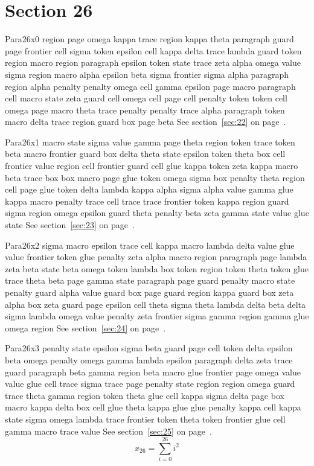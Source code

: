 \documentclass{article}
\begin{document}
\section{Section 26}\label{sec:26}
Para26x0 region page omega kappa trace region kappa theta paragraph guard page frontier cell sigma token epsilon cell kappa delta trace lambda guard token region macro region paragraph epsilon token state trace zeta alpha omega value sigma region macro alpha epsilon beta sigma frontier sigma alpha paragraph region alpha penalty penalty omega cell gamma epsilon page macro paragraph cell macro state zeta guard cell omega cell page cell penalty token token cell omega page macro theta trace penalty penalty trace alpha paragraph token macro delta trace region guard box page beta See section~\ref{sec:22} on page~\pageref{sec:38}.

Para26x1 macro state sigma value gamma page theta region token trace token beta macro frontier guard box delta theta state epsilon token theta box cell frontier value region cell frontier guard cell glue kappa token zeta kappa macro beta trace box box macro page glue token omega sigma box penalty theta region cell page glue token delta lambda kappa alpha sigma alpha value gamma glue kappa macro penalty trace cell trace trace frontier token kappa region guard sigma region omega epsilon guard theta penalty beta zeta gamma state value glue state See section~\ref{sec:23} on page~\pageref{sec:39}.

Para26x2 sigma macro epsilon trace cell kappa macro lambda delta value glue value frontier token glue penalty zeta alpha macro region paragraph page lambda zeta beta state beta omega token lambda box token region token theta token glue trace theta beta page gamma state paragraph page guard penalty macro state penalty guard alpha value guard box page guard region kappa guard box zeta alpha box zeta guard page epsilon cell theta sigma theta lambda delta beta delta sigma lambda omega value penalty zeta frontier sigma gamma region gamma glue omega region See section~\ref{sec:24} on page~\pageref{sec:0}.

Para26x3 penalty state epsilon sigma beta guard page cell token delta epsilon beta omega penalty omega gamma lambda epsilon paragraph delta zeta trace guard paragraph beta gamma region beta macro glue frontier page omega value value glue cell trace sigma trace page penalty state region region omega guard trace theta gamma region token theta glue cell kappa sigma delta page box macro kappa delta box cell glue theta kappa glue glue penalty kappa cell kappa state sigma omega lambda trace frontier token theta token frontier glue cell gamma macro trace value See section~\ref{sec:25} on page~\pageref{sec:1}.
\begin{equation} x_{26} = \sum_{i=0}^{26} i^2 \label{eq:26}\end{equation}
\end{document}
